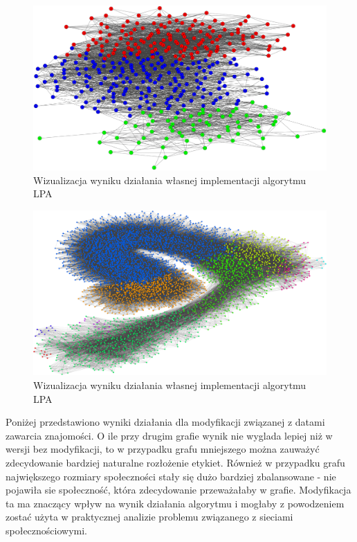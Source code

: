 \documentclass{article}
\begin{document}
\begin{figure}[H]
\centering
\includegraphics[width=\textwidth]{images/ms-lpa-2.png}
\caption{Wizualizacja wyniku działania własnej implementacji algorytmu LPA}
\end{figure}

\begin{figure}[H]
\centering
\includegraphics[width=\textwidth]{images/ms-nba.png}
\caption{Wizualizacja wyniku działania własnej implementacji algorytmu LPA}
\end{figure}

Poniżej przedstawiono wyniki działania dla modyfikacji związanej z datami zawarcia znajomości. O ile przy drugim grafie wynik nie wyglada lepiej niż w wersji bez modyfikacji, to w przypadku grafu mniejszego można zauważyć zdecydowanie bardziej naturalne rozłożenie etykiet. Również w przypadku grafu największego rozmiary społeczności stały się dużo bardziej zbalansowane - nie pojawiła sie społeczność, która zdecydowanie przeważałaby w grafie. Modyfikacja ta ma znaczący wpływ na wynik działania algorytmu i mogłaby z powodzeniem zostać użyta w praktycznej analizie problemu związanego z sieciami społecznościowymi.
\end{document}
